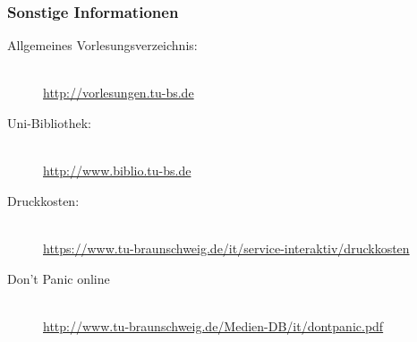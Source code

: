 \subsubsection*{Sonstige Informationen}
	\begin{description}
		\item[Allgemeines Vorlesungsverzeichnis:] ~\\
			{\footnotesize\url{http://vorlesungen.tu-bs.de}}
		\item[Uni-Bibliothek:] ~\\
			{\footnotesize\url{http://www.biblio.tu-bs.de}}
		\item[Druckkosten:] ~\\
			{\footnotesize\url{https://www.tu-braunschweig.de/it/service-interaktiv/druckkosten}}
		\item[Don't Panic online] ~\\
			{\footnotesize\url{http://www.tu-braunschweig.de/Medien-DB/it/dontpanic.pdf}}
	\end{description}

